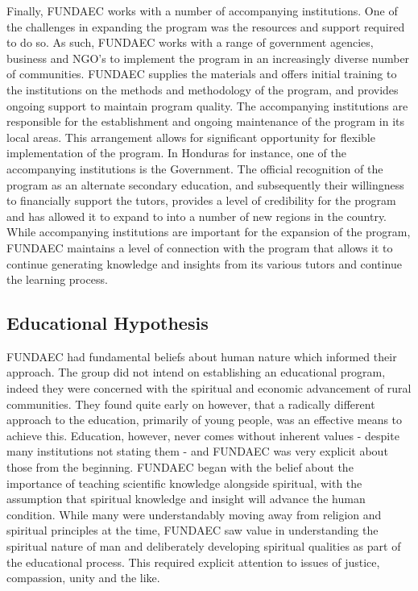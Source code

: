 Finally, FUNDAEC works with a number of accompanying institutions. One of the challenges in expanding the program was the resources and support required to do so. As such, FUNDAEC works with a range of government agencies, business and NGO's to implement the program in an increasingly diverse number of communities. FUNDAEC supplies the materials and offers initial training to the institutions on the methods and methodology of the program, and provides ongoing support to maintain program quality. The accompanying institutions are responsible for the establishment and ongoing maintenance of the program in its local areas. This arrangement allows for significant opportunity for flexible implementation of the program. In Honduras for instance, one of the accompanying institutions is the Government. The official recognition of the program as an alternate secondary education, and subsequently their willingness to financially support the tutors, provides a level of credibility for the program and has allowed it to expand to into a number of new regions in the country. While accompanying institutions are important for the expansion of the program, FUNDAEC maintains a level of connection with the program that allows it to continue generating knowledge and insights from its various tutors and continue the learning process. 



\subsection{Educational Hypothesis}
FUNDAEC had fundamental beliefs about human nature which informed their approach. The group did not intend on establishing an educational program, indeed they were concerned with the spiritual and economic advancement of rural communities. They found quite early on however, that a radically different approach to the education, primarily of young people, was an effective means to achieve this. Education, however, never comes without inherent values - despite many institutions not stating them - and FUNDAEC was very explicit about those from the beginning. FUNDAEC began with the belief about the importance of teaching scientific knowledge alongside spiritual, with the assumption that spiritual knowledge and insight will advance the human condition. While many were understandably moving away from religion and spiritual principles at the time, FUNDAEC saw value in understanding the spiritual nature of man and deliberately developing spiritual qualities as part of the educational process. This required explicit attention to issues of justice, compassion, unity and the like. 

